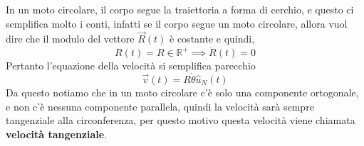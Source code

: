 \documentclass{rapport}
\begin{document}
\newpage
In un moto circolare, il corpo segue la traiettoria a forma di cerchio, e questo ci semplifica molto i conti, infatti se il corpo segue un moto circolare, allora vuol dire che il modulo del vettore $\vec{R}(t)$ è costante e quindi, 
\[
R(t) = R \in \mathbb{R}^+ \implies \dot{R}(t) = 0
\]
Pertanto l'equazione della velocità si semplifica parecchio
\[
\vec{v}(t) =  R \dot{\theta} \hat{u}_N(t)
\]
Da questo notiamo che in un moto circolare c'è solo una componente ortogonale, e non c'è nessuna componente parallela, quindi la velocità sarà sempre tangenziale alla circonferenza, per questo motivo questa velocità viene chiamata \textbf{velocità tangenziale}.
\begin{figure}[htbp]
    \centering
\end{figure}
\end{document}
